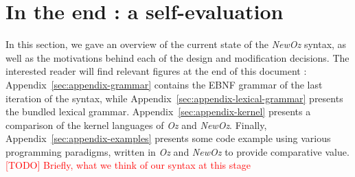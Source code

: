 \section{In the end : a self-evaluation}\label{sec:ch2-evaluation}
In this section, we gave an overview of the current state of the \textit{NewOz} syntax, as well as the motivations behind each of the design and modification decisions.
The interested reader will find relevant figures at the end of this document : Appendix~\ref{sec:appendix-grammar} contains the EBNF grammar of the last iteration of the syntax, while Appendix~\ref{sec:appendix-lexical-grammar} presents the bundled lexical grammar.
Appendix~\ref{sec:appendix-kernel} presents a comparison of the kernel languages of \textit{Oz} and \textit{NewOz}.
Finally, Appendix~\ref{sec:appendix-examples} presents some code example using various programming paradigms, written in \textit{Oz} and \textit{NewOz} to provide comparative value.\newline
\textcolor{red}{[TODO] Briefly, what we think of our syntax at this stage}